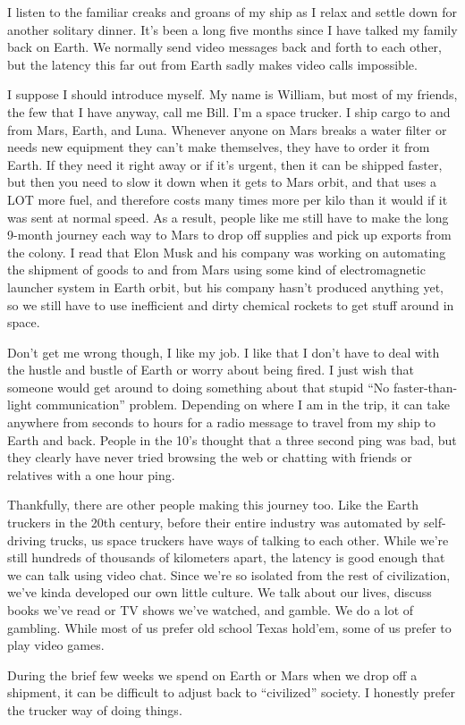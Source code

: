 \documentclass[main.tex]{subfiles}
\begin{document}
I listen to the familiar creaks and groans of my ship as I relax and settle down for another solitary dinner.
It’s been a long five months since I have talked my family back on Earth.
We normally send video messages back and forth to each other, but the latency this far out from Earth sadly makes video
calls impossible.

I suppose I should introduce myself.
My name is William, but most of my friends, the few that I have anyway, call me Bill.
I’m a space trucker.
I ship cargo to and from Mars, Earth, and Luna.
Whenever anyone on Mars breaks a water filter or needs new equipment they can’t make themselves, they have to order it
from Earth.
If they need it right away or if it’s urgent, then it can be shipped faster, but then you need to slow it down when it
gets to Mars orbit, and that uses a LOT more fuel, and therefore costs many times more per kilo than it would if it was
sent at normal speed.
As a result, people like me still have to make the long 9-month journey each way to Mars to drop off supplies and pick
up exports from the colony.
I read that Elon Musk and his company was working on automating the shipment of goods to and from Mars using some kind
of electromagnetic launcher system in Earth orbit, but his company hasn’t produced anything yet, so we still have to use
inefficient and dirty chemical rockets to get stuff around in space.

Don’t get me wrong though, I like my job.
I like that I don’t have to deal with the hustle and bustle of Earth or worry about being fired.
I just wish that someone would get around to doing something about that stupid ``No faster-than-light communication''
problem.
Depending on where I am in the trip, it can take anywhere from seconds to hours for a radio message to travel from my
ship to Earth and back.
People in the 10’s thought that a three second ping was bad, but they clearly have never tried browsing the web or
chatting with friends or relatives with a one hour ping.

Thankfully, there are other people making this journey too.
Like the Earth truckers in the 20th century, before their entire industry was automated by self-driving trucks, us space
truckers have ways of talking to each other.
While we’re still hundreds of thousands of kilometers apart, the latency is good enough that we can talk using video
chat.
Since we’re so isolated from the rest of civilization, we’ve kinda developed our own little culture.
We talk about our lives, discuss books we’ve read or TV shows we’ve watched, and gamble.
We do a lot of gambling.
While most of us prefer old school Texas hold’em, some of us prefer to play video games.

During the brief few weeks we spend on Earth or Mars when we drop off a shipment, it can be difficult to adjust back to
“civilized” society.
I honestly prefer the trucker way of doing things.
\end{document}

